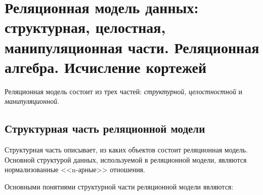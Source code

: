 \chapter{Реляционная модель данных: структурная, целостная, манипуляционная части. Реляционная алгебра. Исчисление кортежей}

Реляционная модель состоит из трех частей: \textit{структурной}, \textit{целостностной} и \textit{манипуляционной}.

\section{Структурная часть реляционной модели}

Структурная часть описывает, из каких объектов состоит реляционная модель. 
Основной структурой данных, используемой в реляционной модели, являются нормализованные <<n-арные>> отношения.

Основными понятиями структурной части реляционной модели являются:


